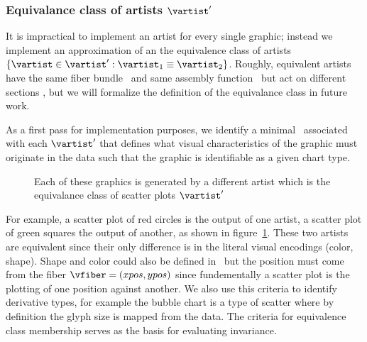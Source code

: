 \documentclass[../main.tex]{subfiles}
\begin{document}
\subsubsection{Equivalance class of artists $\vartist^{\prime}$}
\label{sec:artist_equivalance}
It is impractical to implement an artist for every single graphic; instead we implement an approximation of an the equivalence class of artists $\{\vartist \in \vartist^{\prime}: \vartist_{1} \equiv \vartist_{2}\}$. Roughly, equivalent artists have the same fiber bundle \vtotal\ and same assembly function \vmark\ but act on different sections \vsection, but we will formalize the definition of the equivalance class in future work. 

As a first pass for implementation purposes, we identify a minimal \vfiber\ associated with each $\vartist^{\prime}$ that defines what visual characteristics of the graphic must originate in the data such that the graphic is identifiable as a given chart type.
\begin{figure}[H]
    \caption{Each of these graphics is generated by a different artist \vartist which is the equivalance class of scatter plots $\vartist^{\prime}$}
    \label{fig:artist_equivalence}
\end{figure}

For example, a scatter plot of red circles is the output of one artist, a scatter plot of green squares the output of another, as shown in figure~\ref{fig:artist_equivalence}. These two artists are equivalent since their only difference is in the literal visual encodings (color, shape). Shape and color could also be defined in \vmark\, but the position must come from the fiber $\vfiber=(xpos,ypos)$ since fundementally a scatter plot is the plotting of one position against another\cite{friendlyBriefHistoryData2008}. We also use this criteria to identify derivative types, for example the bubble chart\cite{tufteVisualDisplayQuantitative2001} is a type of scatter where by definition the glyph size is mapped from the data. The criteria for equivalence class membership serves as the basis for evaluating invariance\cite{kindlmann2014algebraic}. 
\end{document}
